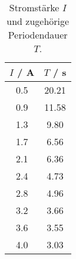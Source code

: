 \begin{table}[!htp]
\centering
\caption{Stromstärke $I$ und zugehörige Periodendauer $T$.}
\label{tab:praezess}
\begin{tabular}{c c}
\toprule
{$I$ / A} & { $T$ / s} \\
\midrule
0.5 & 20.21 \\
0.9 & 11.58 \\
1.3 &  9.80 \\
1.7 &  6.56 \\
2.1 &  6.36 \\
2.4 &  4.73 \\
2.8 &  4.96 \\
3.2 &  3.66 \\
3.6 &  3.55 \\
4.0 &  3.03 \\
\bottomrule
\end{tabular}
\end{table}